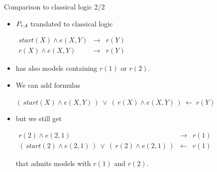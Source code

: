 \documentclass{beamer}
\begin{document}
\begin{frame}{Comparison to classical logic 2/2}
	\onslide<+->
	
	\begin{itemize}
		\item $P_{r,4}$ translated to classical logic
			\begin{center}
				$\begin{array}{rcl}
				start(X) \wedge e(X,Y) & \rightarrow & r(Y) \\
				r(X) \wedge e(X,Y) & \rightarrow & r(Y)
				\end{array}$
			\end{center}
		
		\item has also models containing $r(1)$ or $r(2)$.
		
		\onslide<+->
		
		\item We can add formulas
			\begin{center}
				$(\,start(X) \wedge e(X,Y)\,)\ \vee\ (\,r(X) \wedge e(X,Y)\,) \ \leftarrow \ r(Y)$
			\end{center}
		
		\onslide<+->
		
		\item but we still get
			\begin{center}
				$\begin{array}{rcl}
				r(2) \wedge e(2,1) & \rightarrow & r(1) \\
				(\,start(2) \wedge e(2,1)\,)\ \vee\ (\,r(2) \wedge e(2,1)\,) & \leftarrow & r(1)
				\end{array}$
			\end{center}
			that admits models with $r(1)$ and $r(2)$.
% 		
% 		
		
	\end{itemize}
	
\end{frame}
\end{document}
